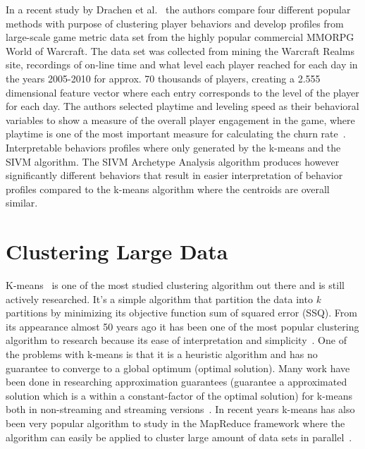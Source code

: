 In a recent study by Drachen et al.~\citep{Drachen:2013} the authors compare four different popular methods with purpose of clustering player behaviors and develop profiles from large-scale game metric data set from the highly popular commercial MMORPG World of Warcraft. The data set was collected from mining the Warcraft Realms site, recordings of on-line time and what level each player reached for each day in the years 2005-2010 for approx. 70 thousands of players, creating a 2.555 dimensional feature vector where each entry corresponds to the level of the player for each day. The authors selected playtime and leveling speed as their behavioral variables to show a measure of the overall player engagement in the game, where playtime is one of the most important measure for calculating the churn rate~\citep{Fields:2011SocialGame, Seif:2013GameAnalytics}. Interpretable behaviors profiles where only generated by the k-means and the SIVM algorithm. The SIVM Archetype Analysis algorithm produces however significantly different behaviors that result in easier interpretation of behavior profiles compared to the k-means algorithm where the centroids are overall similar.	

\section{Clustering Large Data}
K-means~\citep{FORGYE.W.:1965, MacQueen:1967KMeans, Lloyd:1982} is one of the most studied clustering algorithm out there and is still actively researched. It's a simple algorithm that partition the data into \textit{k} partitions by minimizing its objective function sum of squared error (SSQ). From its appearance almost 50 years ago it has been one of the most popular clustering algorithm to research because its ease of interpretation and simplicity~\citep{Xu:2005Clustering, Jain:2008KMSurvey, Rokach:2010Survey}. One of the problems with k-means is that it is a heuristic algorithm and has no guarantee to converge to a global optimum (optimal solution). Many work have been done in researching approximation guarantees (guarantee a approximated solution which is a within a constant-factor of the optimal solution) for k-means both in non-streaming and streaming versions~\citep{Kanungo:2002KM, Arthur:2007, Ailon:2009, Braverman:2011, Shindler:2011}. In recent years k-means has also been very popular algorithm to study in the MapReduce framework where the algorithm can easily be applied to cluster large amount of data sets in parallel~\citep{Dean:2004, Zhao:2009, Ngazimbi:2009MSc, Christopoulos:2011Thesis, Ramamoorthy:2011MSc}.

